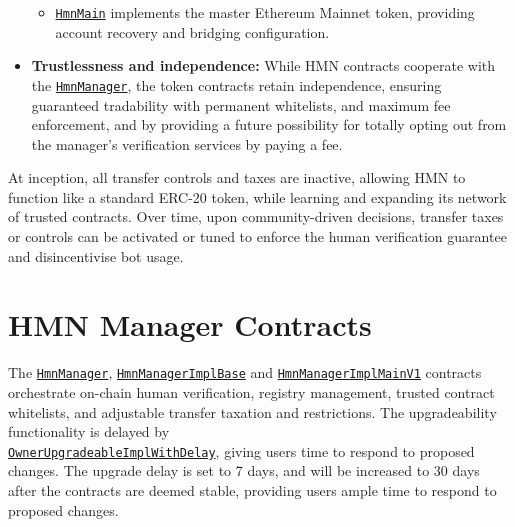 \documentclass[12pt,a4paper]{article}
\begin{document}
\begin{itemize}
\begin{itemize}
              \item \texttt{\href{https://github.com/hmn-is/hmn-contracts/blob/main/src/HmnMain.sol}{HmnMain}} implements the master Ethereum Mainnet token, providing account recovery and bridging configuration.
          \end{itemize}
    \item \textbf{Trustlessness and independence:} While HMN contracts cooperate with the \texttt{\href{https://github.com/hmn-is/hmn-contracts/blob/main/src/HmnManager.sol}{HmnManager}}, the token contracts retain independence, ensuring guaranteed tradability with permanent whitelists, and maximum fee enforcement, and by providing a future possibility for totally opting out from the manager's verification services by paying a fee.
\end{itemize}

At inception, all transfer controls and taxes are inactive, allowing HMN to function like a standard ERC-20 token, while learning and expanding its network of trusted contracts.
Over time, upon community-driven decisions, transfer taxes or controls can be activated or tuned to enforce the human verification guarantee and disincentivise bot usage.

\section{HMN Manager Contracts}
The \texttt{\href{https://github.com/hmn-is/hmn-contracts/blob/main/src/HmnManager.sol}{HmnManager}}, \texttt{\href{https://github.com/hmn-is/hmn-contracts/blob/main/src/HmnManagerImplBase.sol}{HmnManagerImplBase}} and \texttt{\href{https://github.com/hmn-is/hmn-contracts/blob/main/src/HmnManagerImplMainV1.sol}{HmnManagerImplMainV1}} contracts orchestrate on-chain human verification, registry management, trusted contract whitelists, and adjustable transfer taxation and restrictions.
The upgradeability functionality is delayed by\\\texttt{\href{https://github.com/hmn-is/hmn-contracts/blob/main/src/abstract/OwnerUpgradeableImplWithDelay.sol}{OwnerUpgradeableImplWithDelay}}, giving users time to respond to proposed changes.
The upgrade delay is set to 7 days, and will be increased to 30 days after the contracts are deemed stable, providing users ample time to respond to proposed changes.
\end{document}
